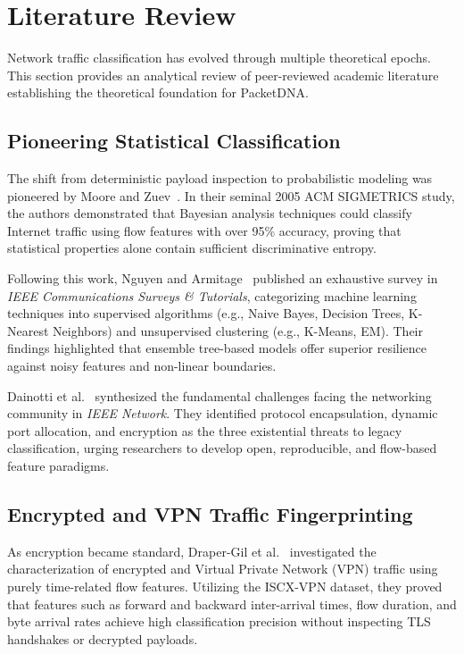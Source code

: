 \documentclass[10pt,journal,compsoc]{IEEEtran}
\begin{document}
\section{Literature Review}
Network traffic classification has evolved through multiple theoretical epochs. This section provides an analytical review of peer-reviewed academic literature establishing the theoretical foundation for PacketDNA.

\subsection{Pioneering Statistical Classification}
The shift from deterministic payload inspection to probabilistic modeling was pioneered by Moore and Zuev~\cite{moore2005internet}. In their seminal 2005 ACM SIGMETRICS study, the authors demonstrated that Bayesian analysis techniques could classify Internet traffic using flow features with over 95\% accuracy, proving that statistical properties alone contain sufficient discriminative entropy.

Following this work, Nguyen and Armitage~\cite{nguyen2008survey} published an exhaustive survey in \textit{IEEE Communications Surveys \& Tutorials}, categorizing machine learning techniques into supervised algorithms (e.g., Naive Bayes, Decision Trees, K-Nearest Neighbors) and unsupervised clustering (e.g., K-Means, EM). Their findings highlighted that ensemble tree-based models offer superior resilience against noisy features and non-linear boundaries.

Dainotti et al.~\cite{dainotti2012issues} synthesized the fundamental challenges facing the networking community in \textit{IEEE Network}. They identified protocol encapsulation, dynamic port allocation, and encryption as the three existential threats to legacy classification, urging researchers to develop open, reproducible, and flow-based feature paradigms.

\subsection{Encrypted and VPN Traffic Fingerprinting}
As encryption became standard, Draper-Gil et al.~\cite{drapergil2016characterization} investigated the characterization of encrypted and Virtual Private Network (VPN) traffic using purely time-related flow features. Utilizing the ISCX-VPN dataset, they proved that features such as forward and backward inter-arrival times, flow duration, and byte arrival rates achieve high classification precision without inspecting TLS handshakes or decrypted payloads.
\end{document}
